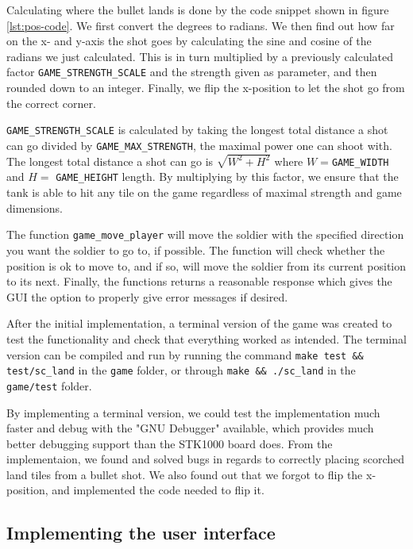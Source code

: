

Calculating where the bullet lands is done by the code snippet shown in
figure \ref{lst:pos-code}. We first convert the degrees to radians. We
then find out how far on the x- and y-axis the shot goes by calculating
the sine and cosine of the radians we just calculated. This is in turn
multiplied by a previously calculated factor
\texttt{GAME\_STRENGTH\_SCALE} and the strength given as parameter, and
then rounded down to an integer. Finally, we flip the x-position to
let the shot go from the correct corner.

\texttt{GAME\_STRENGTH\_SCALE} is calculated by taking the longest total
distance a shot can go divided by \texttt{GAME\_MAX\_STRENGTH}, the
maximal power one can shoot with.  The longest total distance a shot can
go is $\sqrt{W^2 + H^2}$ where $W = $\texttt{GAME\_WIDTH} and $H =$
\texttt{GAME\_HEIGHT} length.  By multiplying by this factor, we ensure
that the tank is able to hit any tile on the game regardless of maximal
strength and game dimensions. 



The function \texttt{game\_move\_player} will move the soldier with the
specified direction you want the soldier to go to, if possible. The
function will check whether the position is ok to move to, and if so,
will move the soldier from its current position to its next. Finally,
the functions returns a reasonable response which gives the GUI
the option to properly give error messages if desired.

After the initial implementation, a terminal version of the game was
created to test the functionality and check that everything worked as intended.
The terminal version can be compiled and run by running the command 
\verb|make test && test/sc_land| in the \texttt{game} folder, or
through \verb|make && ./sc_land| in the \texttt{game/test} folder.



By implementing a terminal version, we could test the implementation
much faster and debug with the "GNU Debugger" available, which provides 
much better debugging support than the STK1000 board does. From the
implementaion, we found and solved bugs in regards to correctly placing
scorched land tiles from a bullet shot. We also found out that we forgot to
flip the x-position, and implemented the code needed to flip it.

\subsection{Implementing the user interface}

